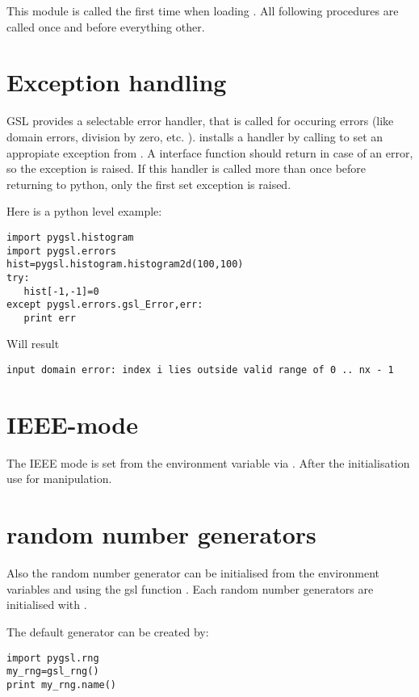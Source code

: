 
This module is called the first time when loading .
All following procedures are called once and before everything other.

\section{Exception handling}
 GSL provides a selectable error
handler, that is called for occuring errors (like domain errors, division by
zero, etc. ).   installs a handler by calling
 to set an appropiate exception from
.  A  interface function should return
 in case of an error, so the exception is raised.  If this handler
is called more than once before returning to python, only the first set
exception is raised.

Here is a python level example:
\begin{verbatim}
import pygsl.histogram
import pygsl.errors
hist=pygsl.histogram.histogram2d(100,100)
try:
   hist[-1,-1]=0
except pygsl.errors.gsl_Error,err:
   print err
\end{verbatim}
Will result
\begin{verbatim}
input domain error: index i lies outside valid range of 0 .. nx - 1
\end{verbatim}

\section{IEEE-mode}
The IEEE mode is set from the environment variable  via .
After the initialisation use  for manipulation.

\section{random number generators}
Also the random number generator can be initialised from the environment variables 
and  using the gsl function .
Each random number generators are initialised with .

The default generator can be created by:\nopagebreak
\begin{verbatim}
import pygsl.rng
my_rng=gsl_rng()
print my_rng.name()
\end{verbatim}
